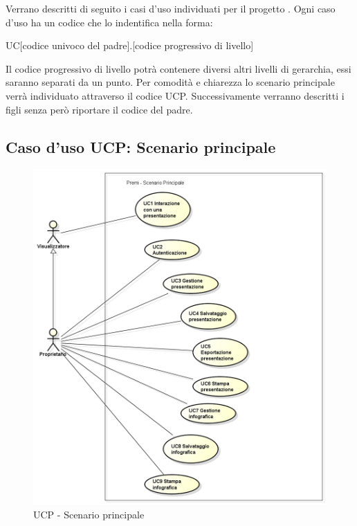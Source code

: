 Verrano descritti di seguito i casi d'uso individuati per il progetto \PROGETTO. Ogni caso d'uso ha un codice che lo indentifica nella forma:
\begin{center}
	UC[codice univoco del padre].[codice progressivo di livello]
\end{center}
Il codice progressivo di livello potrà contenere diversi altri livelli di gerarchia, essi saranno separati da un punto. Per comodità e chiarezza lo scenario principale verrà individuato attraverso il codice UCP. Successivamente verranno descritti i figli senza però riportare il codice del padre.

\subsection{Caso d'uso UCP: Scenario principale}
\begin{figure}[h] 
	\centering 
	\includegraphics[scale=0.5] {img/UCP.png} 
	\caption{UCP - Scenario principale} 
\end{figure}

\newpage

